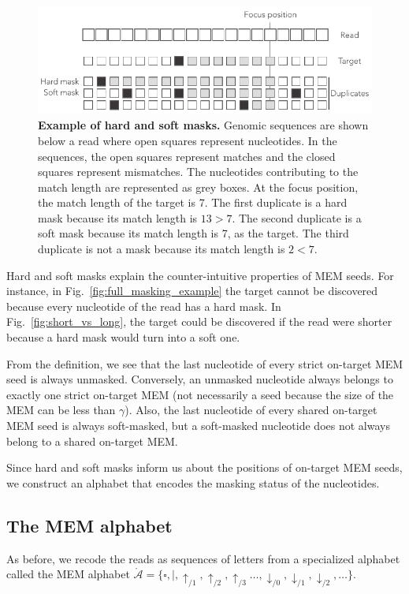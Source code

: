 \documentclass{article}
\begin{document}
\begin{figure}[h]
\centering
\includegraphics[scale=0.85]{hard_vs_soft_masks.pdf}
\caption{\textbf{Example of hard and soft masks.}
Genomic sequences are shown below a read where open squares represent
nucleotides. In the sequences, the open squares represent matches and the
closed squares represent mismatches. The nucleotides contributing to the
match length are represented as grey boxes. At the focus position, the
match length of the target is 7. The first duplicate is a hard mask
because its match length is $13>7$. The second duplicate is a soft mask
because its match length is 7, as the target. The third duplicate is not
a mask because its match length is $2<7$.}
\label{fig:hard_vs_soft_masks}
\end{figure}

Hard and soft masks explain the counter-intuitive properties of MEM seeds.
For instance, in Fig.~\ref{fig:full_masking_example} the target cannot be
discovered because every nucleotide of the read has a hard mask. In
Fig.~\ref{fig:short_vs_long}, the target could be discovered if the read
were shorter because a hard mask would turn into a soft one.

From the definition, we see that the last nucleotide of every strict
on-target MEM seed is always unmasked. Conversely, an unmasked nucleotide
always belongs to exactly one strict on-target MEM (not necessarily a seed
because the size of the MEM can be less than $\gamma$). Also, the last
nucleotide of every shared on-target MEM seed is always soft-masked, but a
soft-masked nucleotide does not always belong to a shared on-target MEM.

Since hard and soft masks inform us about the positions of on-target
MEM seeds, we construct an alphabet that encodes the masking status of the
nucleotides.

\subsection{The MEM alphabet}

As before, we recode the reads as sequences of letters from a specialized
alphabet called the MEM alphabet $\mathring{\mathcal{A}} = \{\square, |,
\uparrow_{/1}, \uparrow_{/2}, \uparrow_{/3} \ldots, \downarrow_{/0},
\downarrow_{/1}, \downarrow_{/2}, \ldots\}$.
\end{document}
